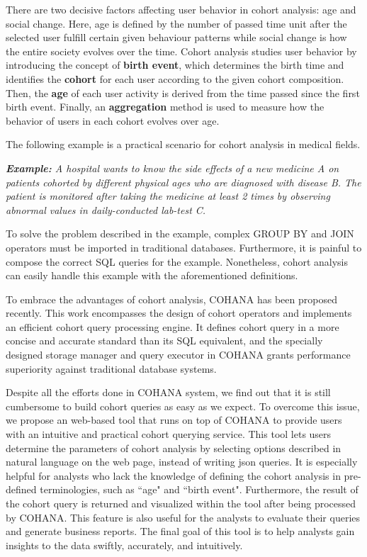 \documentclass[10pt,conference,letterpaper]{IEEEtran}
\begin{document}
There are two decisive factors affecting user behavior in cohort analysis: age and social change. Here, age is defined by the number of passed time unit after the selected user fulfill certain given behaviour patterns while social change is how the entire society evolves over the time. 
Cohort analysis studies user behavior by introducing the concept of \textbf{birth event}, which determines the birth time and identifies the \textbf{cohort} for each user according to the given cohort composition. Then, the \textbf{age} of each user activity is derived from the time passed since the first birth event. Finally, an \textbf{aggregation} method is used to measure how the behavior of users in each cohort evolves over age.


The following example is a practical scenario for cohort analysis in medical fields.

\emph{\textbf{Example:} A hospital wants to know the side effects of a new medicine A on patients cohorted by different physical ages who are diagnosed with disease B. The patient is monitored after taking the medicine at least 2 times by observing abnormal values in daily-conducted lab-test C.}

To solve the problem described in the example, complex GROUP BY and JOIN operators must be imported in traditional databases.
Furthermore, it is painful to compose the correct SQL queries for the example.
Nonetheless, 
cohort analysis can easily handle this example with the aforementioned definitions.

To embrace the advantages of cohort analysis, COHANA\cite{jiang2016cohort} has been proposed recently. 
This work encompasses the design of cohort operators and implements an efficient cohort query processing engine. It defines cohort query in a more concise and accurate standard than its SQL equivalent, and the specially designed storage manager and query executor in COHANA grants performance superiority against traditional database systems. 

Despite all the efforts done in COHANA system, we find out that it is still cumbersome to build cohort queries as easy as we expect.
To overcome this issue, we propose an web-based tool that runs on top of COHANA to provide users with an intuitive and practical cohort querying service. 
This tool lets users determine the parameters of cohort analysis by selecting options described in natural language on the web page, instead of writing json queries. 
It is especially helpful for analysts who lack the knowledge of defining the cohort analysis in pre-defined terminologies, such as ``age" and ``birth event". 
Furthermore, the result of the cohort query is returned and visualized within the tool
after being processed by COHANA.
This feature is also useful for the analysts to evaluate their queries and generate business reports.
The final goal of this tool is to help analysts gain insights to the data swiftly, accurately, and intuitively.
\end{document}
